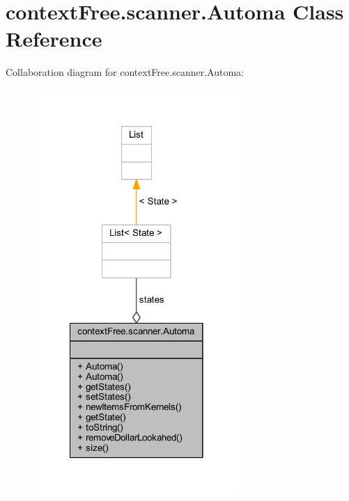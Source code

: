 \hypertarget{classcontext_free_1_1scanner_1_1_automa}{\section{context\-Free.\-scanner.\-Automa Class Reference}
\label{classcontext_free_1_1scanner_1_1_automa}
}


Collaboration diagram for context\-Free.\-scanner.\-Automa\-:\nopagebreak
\begin{figure}[H]
\begin{center}
\leavevmode
\includegraphics[width=222pt]{classcontext_free_1_1scanner_1_1_automa__coll__graph}
\end{center}
\end{figure}
